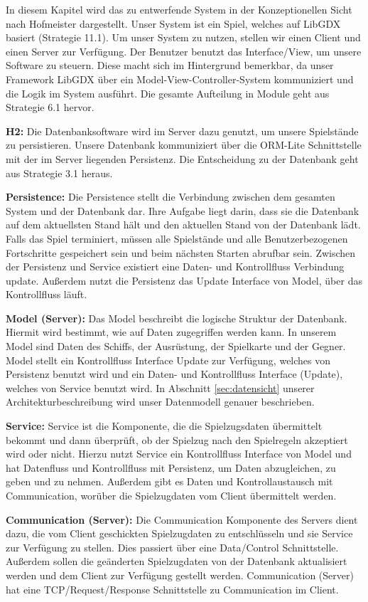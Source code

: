 \documentclass[fontsize=12pt,paper=a4,twoside]{scrartcl}
\begin{document}
In diesem Kapitel wird das zu entwerfende System in der Konzeptionellen Sicht nach Hofmeister dargestellt. Unser System ist ein Spiel, welches auf LibGDX basiert (Strategie 11.1). Um unser System zu nutzen, stellen wir einen Client und einen Server zur Verfügung. Der Benutzer benutzt das Interface/View, um unsere Software zu steuern. Diese macht sich im Hintergrund bemerkbar, da unser Framework LibGDX über ein Model-View-Controller-System kommuniziert und die Logik im System ausführt. Die gesamte Aufteilung in Module geht aus Strategie 6.1 hervor.

\textbf{H2:} 
Die Datenbanksoftware wird im Server dazu genutzt, um unsere Spielstände zu persistieren. Unsere Datenbank kommuniziert über die ORM-Lite Schnittstelle mit der im Server liegenden Persistenz. Die Entscheidung zu der Datenbank geht aus Strategie 3.1 heraus.  

\textbf{Persistence:}
Die Persistence stellt die Verbindung zwischen dem gesamten System und der Datenbank dar. Ihre Aufgabe liegt darin, dass sie die Datenbank auf dem aktuellsten Stand hält und den aktuellen Stand von der Datenbank lädt. Falls das Spiel terminiert, müssen alle Spielstände und alle Benutzerbezogenen Fortschritte gespeichert sein und beim nächsten Starten abrufbar sein. Zwischen der Persistenz und Service existiert eine Daten- und Kontrollfluss Verbindung update. Außerdem nutzt die Persistenz das Update Interface von Model, über das Kontrollfluss läuft. 

\textbf{Model (Server):}
Das Model beschreibt die logische Struktur der Datenbank. Hiermit wird bestimmt, wie auf Daten zugegriffen werden kann. 
In unserem Model sind Daten des Schiffs, der Ausrüstung, der Spielkarte und der Gegner. Model stellt ein Kontrollfluss Interface Update zur Verfügung, welches von Persistenz benutzt wird und ein Daten- und Kontrollfluss Interface (Update), welches von Service benutzt wird. In Abschnitt \ref{sec:datensicht} unserer Architekturbeschreibung wird unser Datenmodell genauer beschrieben. 

\textbf{Service:}
Service ist die Komponente, die die Spielzugsdaten übermittelt bekommt und dann überprüft, ob der Spielzug nach den Spielregeln akzeptiert wird oder nicht. Hierzu nutzt Service ein Kontrollfluss Interface von Model und hat Datenfluss und Kontrollfluss mit Persistenz, um Daten abzugleichen, zu geben und zu nehmen. Außerdem gibt es Daten und Kontrollaustausch mit Communication, worüber die Spielzugdaten vom Client übermittelt werden. 

\textbf{Communication (Server):}
Die Communication Komponente des Servers dient dazu, die vom Client geschickten Spielzugdaten zu entschlüsseln und sie Service zur Verfügung zu stellen. Dies passiert über eine Data/Control Schnittstelle. Außerdem sollen die geänderten Spielzugdaten von der Datenbank aktualisiert werden und dem Client zur Verfügung gestellt werden. Communication (Server) hat eine TCP/Request/Response Schnittstelle zu Communication im Client. 
\end{document}
